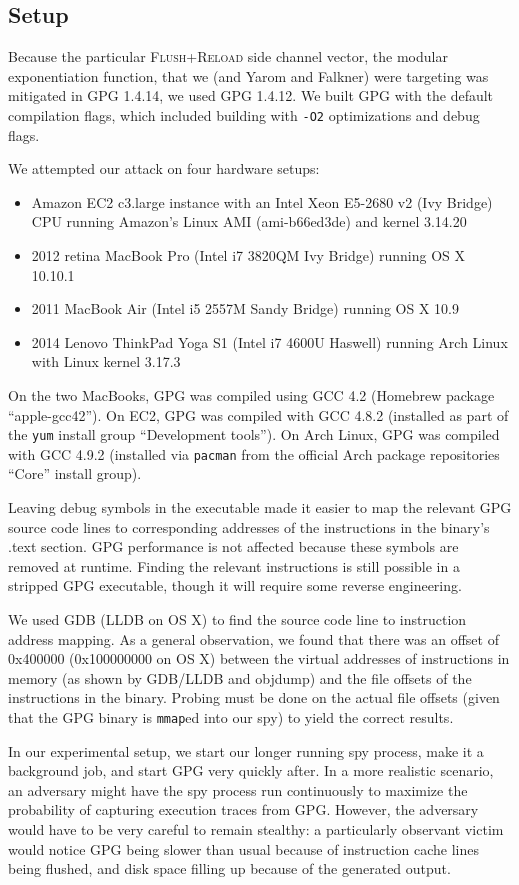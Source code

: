 \documentclass[11pt]{llncs}
\newcommand{\flushreload}{\textsc{Flush}+\textsc{Reload}}
\newcommand{\litem}{\item[\lobclaw{simple}] }
\begin{document}
\subsection{Setup}

Because the particular \flushreload{} side channel vector, the modular
exponentiation function, that we (and Yarom and Falkner\cite{YF13}) were
targeting was mitigated in GPG 1.4.14, we used GPG 1.4.12. We built GPG with the
default compilation flags, which included building with \texttt{-O2}
optimizations and debug flags.

We attempted our attack on four hardware setups:
\begin{itemize}
    \litem Amazon EC2 c3.large instance with an Intel Xeon E5-2680 v2 (Ivy
        Bridge) CPU running Amazon's Linux AMI (ami-b66ed3de) and kernel 3.14.20
    \litem 2012 retina MacBook Pro (Intel i7 3820QM Ivy Bridge) running OS X
        10.10.1
    \litem 2011 MacBook Air (Intel i5 2557M Sandy Bridge) running OS X 10.9
    \litem 2014 Lenovo ThinkPad Yoga S1 (Intel i7 4600U Haswell) running Arch
        Linux with Linux kernel 3.17.3
\end{itemize}

On the two MacBooks, GPG was compiled using GCC 4.2 (Homebrew package
``apple-gcc42''). On EC2, GPG was compiled with GCC 4.8.2 (installed as part of
the \texttt{yum} install group ``Development tools''). On Arch Linux, GPG was
compiled with GCC 4.9.2 (installed via \texttt{pacman} from the official Arch
package repositories ``Core'' install group).

Leaving debug symbols in the executable made it easier to map the relevant GPG
source code lines to corresponding addresses of the instructions in the binary's
.text section. GPG performance is not affected because these symbols are removed
at runtime. Finding the relevant instructions is still possible in a stripped
GPG executable, though it will require some reverse engineering.

We used GDB (LLDB on OS X) to find the source code line to instruction address
mapping. As a general observation, we found that there was an offset of 0x400000
(0x100000000 on OS X) between the virtual addresses of instructions in memory
(as shown by GDB/LLDB and objdump) and the file offsets of the instructions in
the binary. Probing must be done on the actual file offsets (given that the GPG
binary is \texttt{mmap}ed into our spy) to yield the correct results.

In our experimental setup, we start our longer running spy process, make it a
background job, and start GPG very quickly after. In a more realistic scenario,
an adversary might have the spy process run continuously to maximize the
probability of capturing execution traces from GPG. However, the adversary would
have to be very careful to remain stealthy: a particularly observant victim
would notice GPG being slower than usual because of instruction cache lines
being flushed, and disk space filling up because of the generated output.
\end{document}
